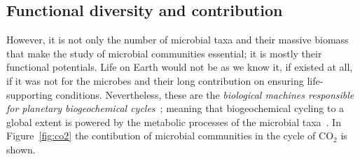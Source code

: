    \subsection{Functional diversity and contribution}
   However, it is not only the number of microbial taxa and their massive biomass that
   make the study of microbial communities essential; 
   it is mostly their functional potentials. 
   Life on Earth would not be as we know it, if existed at all, if it was not for the 
   microbes and their long contribution on ensuring life-supporting conditions. 
   Nevertheless, these are the \textit{biological machines responsible for planetary
   biogeochemical cycles}~\cite{falkowski2008microbial}; meaning that biogeochemical cycling 
   to a global extent
   is powered by the metabolic processes of the microbial taxa~\cite{louca2016decoupling}. 
   In Figure~\ref{fig:co2} the contibution of microbial communities 
   in the cycle of CO$_2$ is shown. 

